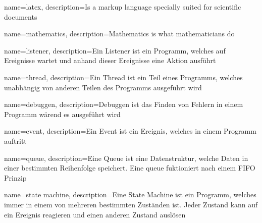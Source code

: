 \usepackage{glossaries}
\usepackage[automake]{glossaries-extra}
\makeglossaries

{
  name=latex,
  description={Is a markup language specially suited for scientific documents}
}

{
  name=mathematics,
  description={Mathematics is what mathematicians do}
}

{
  name=listener,
  description={Ein Listener ist ein Programm, welches auf Ereignisse wartet und anhand dieser Ereignisse eine Aktion ausführt}
}

{
  name=thread,
  description={Ein Thread ist ein Teil eines Programms, welches unabhängig von anderen Teilen des Programms ausgeführt wird}
}

{
  name=debuggen,
  description={Debuggen ist das Finden von Fehlern in einem Programm wärend es ausgeführt wird}
}

{
  name=event,
  description={Ein Event ist ein Ereignis, welches in einem Programm auftritt}
}

{
  name=queue,
  description={Eine Queue ist eine Datenstruktur, welche Daten in einer bestimmten Reihenfolge speichert. Eine queue fuktioniert nach einem \ac{FIFO} Prinzip}
}

{
  name=state machine,
  description={Eine State Machine ist ein Programm, welches immer in einem von mehreren bestimmten Zuständen ist. Jeder Zustand kann auf ein Ereignis reagieren und einen anderen Zustand auslösen}
}





